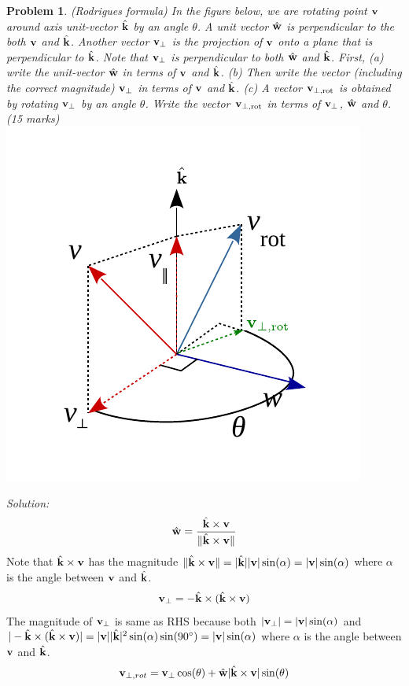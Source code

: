 \documentclass{article}
\newtheorem{prob}{Problem}
\newenvironment{solution}{\emph{Solution:}}{}
\begin{document}
\begin{prob}
  (Rodrigues formula) In the figure below, we are rotating point $\mathbf{v}$ around
  axis unit-vector $\hat{\mathbf{k}}$ by an angle $\theta$. A unit vector $\hat{\mathbf{w}}$ is
  perpendicular to the both $\mathbf{v}$ and $\hat{\mathbf{k}}$. Another vector $\mathbf{v}_{\perp}$ is the projection of $\mathbf{v}$ onto a plane that is perpendicular to $\hat{\mathbf{k}}$. Note that $\mathbf{v}_{\perp}$ is perpendicular to both $\hat{\mathbf{w}}$ and $\hat{\mathbf{k}}$. First, (a) write the
  unit-vector $\hat{\mathbf{w}}$ in terms of $\mathbf{v}$ and $\hat{\mathbf{k}}$.
  (b) Then write the vector (including the correct magnitude) $\mathbf{v}_\perp$ in terms of $\mathbf{v}$ and $\hat{\mathbf{k}}$.
  (c) A vector $\mathbf{v}_{\perp,\text{rot}}$ is obtained by rotating $\mathbf{v}_\perp$ by an angle $\theta$. Write the vector $\mathbf{v}_{\perp,\text{rot}}$ in terms of $\mathbf{v}_{\perp}$, $\hat{\mathbf{w}}$ and $\theta$. 
  (15 marks)\\
  \includegraphics[width=0.5\linewidth]{media/Rodrigues-formula.pdf}
\end{prob}
\begin{solution}
\begin{align}
  \hat{\mathbf{w}} = \frac{\hat{\mathbf{k}} \times \mathbf{v}}{\|\hat{\mathbf{k}} \times \mathbf{v}\|}
\end{align}
Note that $\hat{\mathbf{k}} \times \mathbf{v}$ has the magnitude $\|\hat{\mathbf{k}} \times \mathbf{v}\| = |\hat{\mathbf{k}}||\mathbf{v}| \sin(\alpha) = |\mathbf{v}| \sin(\alpha)$ where $\alpha$ is the angle between $\mathbf{v}$ and $\hat{\mathbf{k}}$.
\begin{align}
\mathbf{v}_\perp = -\hat{\mathbf{k}} \times (\hat{\mathbf{k}} \times \mathbf{v})
\end{align}
The magnitude of $\mathbf{v}_\perp$ is same as RHS because both $|\mathbf{v}_\perp| = |\mathbf{v}|\sin(\alpha)$ and $|-\hat{\mathbf{k}} \times (\hat{\mathbf{k}}  \times \mathbf{v})| = |\mathbf{v}||\hat{\mathbf{k}}|^2 \sin(\alpha) \sin(90^\circ) = |\mathbf{v}|\sin(\alpha)$ where $\alpha$ is the angle between $\mathbf{v}$ and $\hat{\mathbf{k}}$.
\begin{align}
  \mathbf{v}_{\perp,rot} = \mathbf{v}_\perp \cos(\theta) +
  \hat{\mathbf{w}}|\hat{\mathbf{k}} \times \mathbf{v}| \sin(\theta)
\end{align}
\end{solution}
\end{document}
